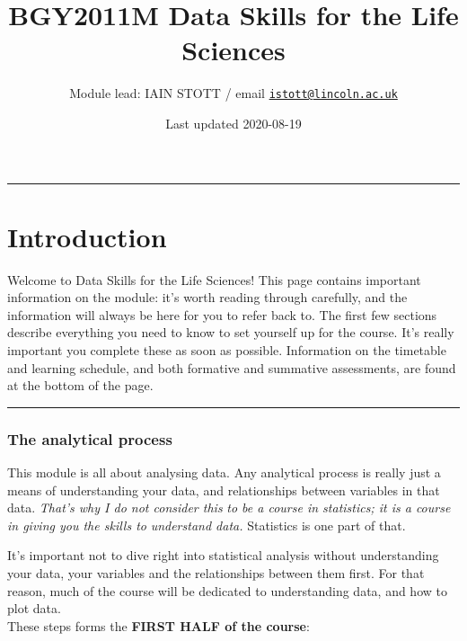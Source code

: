 \documentclass[
]{book}
\title{BGY2011M Data Skills for the Life Sciences}
\author{Module lead: IAIN STOTT / email \href{mailto:istott@lincoln.ac.uk}{\nolinkurl{istott@lincoln.ac.uk}}}
\date{Last updated 2020-08-19}
\begin{document}
\maketitle

{
\setcounter{tocdepth}{1}
\tableofcontents
}
\begin{center}\rule{0.5\linewidth}{0.5pt}\end{center}

\hypertarget{introduction}{%
\chapter{Introduction}\label{introduction}}

Welcome to Data Skills for the Life Sciences! This page contains important
information on the module: it's worth reading through carefully, and the
information will always be here for you to refer back to. The first few sections
describe everything you need to know to set yourself up for the course. It's
really important you complete these as soon as possible. Information on the
timetable and learning schedule, and both formative and summative assessments,
are found at the bottom of the page.

\begin{center}\rule{0.5\linewidth}{0.5pt}\end{center}

\hypertarget{the-analytical-process}{%
\subsection{The analytical process}\label{the-analytical-process}}

This module is all about analysing data.
Any analytical process is really just a means of understanding your data, and
relationships between variables in that data. \emph{That's why I do not consider this}
\emph{to be a course in statistics; it is a course in giving you the skills to}
\emph{understand data.} Statistics is one part of that.

It's important not to dive right into statistical analysis without
understanding your data, your variables and the relationships between them
first. For that reason, much of the course will be dedicated to understanding
data, and how to plot data.\\
These steps forms the \textbf{FIRST HALF of the course}:
\end{document}
